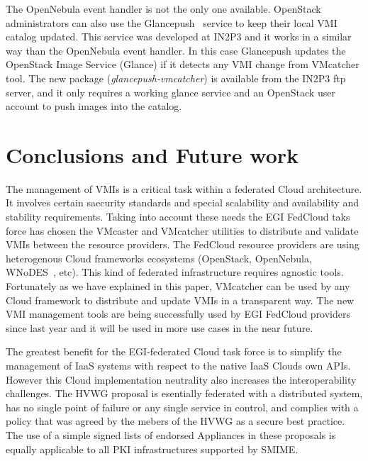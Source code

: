 \documentclass{cai}
\begin{document}
The OpenNebula event handler is not the only one available. OpenStack administrators can also use the Glancepush~\cite{glancepush} service to keep their local VMI catalog updated. 
This service was developed at IN2P3 and it works in a similar way than the OpenNebula event handler. 
In this case Glancepush updates the OpenStack Image Service (Glance) if it detects any VMI change from VMcatcher tool. 
The new package (\textit{glancepush-vmcatcher}) is available from the IN2P3 ftp server, and it only requires a working glance service and an OpenStack user account to push images into the catalog.


\section{Conclusions and Future work}
\label{sect-conclusions}
The management of VMIs is a critical task within a federated Cloud architecture. It involves certain saecurity standards and special scalability and availability and stability requirements.
Taking into account these needs the EGI FedCloud taks force has chosen the VMcaster and VMcatcher utilities to distribute and validate VMIs between the resource providers.
The FedCloud resource providers are using heterogenous Cloud frameworks ecosystems (OpenStack, OpenNebula, WNoDES~\cite{wnodes}, etc). This kind of federated infrastructure requires agnostic tools.
Fortunately as we have explained in this paper, VMcatcher can be used by any Cloud framework to distribute and update VMIs in a transparent way. 
The new VMI management tools are being successfully used by EGI FedCloud providers since last year and it will be used in more use cases in the near future.

The greatest benefit for the EGI-federated Cloud task force is to simplify the management of IaaS systems with respect to the native IaaS Clouds own APIs. 
However this Cloud implementation neutrality also increases the interoperability challenges. 
The HVWG proposal is esentially federated with a distributed system, has no single point of failure or any single service in control, and complies with a policy that was agreed by the mebers of the HVWG as a secure best practice.
The use of a simple signed lists of endorsed Appliances in these proposals is equally applicable to all PKI infrastructures supported by SMIME. 
\end{document}
